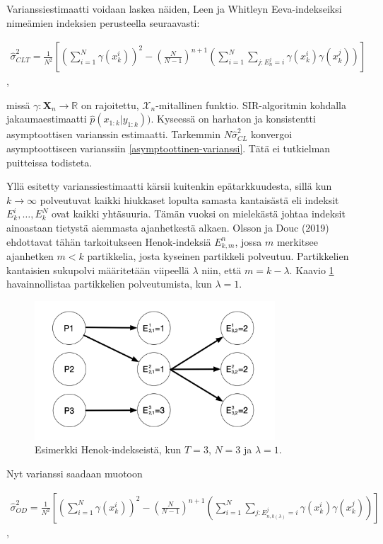 \documentclass[
  12pt,
  a4paper, twoside]{book}
\begin{document}
Varianssiestimaatti voidaan laskea näiden, Leen ja Whitleyn Eeva-indekseiksi nimeämien indeksien perusteella seuraavasti:

\begin{align}\label{CLT-varianssi}
\hat{\sigma}^2_{CLT} = \frac{1}{N^2} \left[ (\sum_{i=1}^N \gamma(x_k^i))^2 - (\frac{N}{N-1})^{n+1} ( \sum_{i=1}^N \sum_{j:E_n^j=i} \gamma(x_k^i) \gamma(x_k^j)) \right]
\end{align},

missä \(\gamma: \mathbf{X}_n \rightarrow \mathbb{R}\) on rajoitettu, \(\mathcal{X}_n\)-mitallinen funktio. SIR-algoritmin kohdalla jakaumaestimaatti \(\hat{p}(x_{1:k}|y_{1:k}))\). Kyseessä on harhaton ja konsistentti asymptoottisen varianssin estimaatti. Tarkemmin \(N\hat{\sigma}^2_{CL}\) konvergoi asymptoottiseen varianssiin \ref{asymptoottinen-varianssi}. Tätä ei tutkielman puitteissa todisteta.

Yllä esitetty varianssiestimaatti kärsii kuitenkin epätarkkuudesta, sillä kun \(k \to \infty\) polveutuvat kaikki hiukkaset lopulta samasta kantaisästä eli indeksit \(E_k^i,\ldots,E_k^N\) ovat kaikki yhtäsuuria. Tämän vuoksi on mielekästä johtaa indeksit ainoastaan tietystä aiemmasta ajanhetkestä alkaen. Olsson ja Douc (2019) \citep{olsson-2019} ehdottavat tähän tarkoitukseen Henok-indeksiä \(E_{k,m}^n\), jossa \(m\) merkitsee ajanhetken \(m<k\) partikkelia, josta kyseinen partikkeli polveutuu. Partikkelien kantaisien sukupolvi määritetään viipeellä \(\lambda\) niin, että \(m=k-\lambda\). Kaavio \ref{fig:henok-indeksit} havainnollistaa partikkelien polveutumista, kun \(\lambda=1\).

\begin{figure}[H]
\centering
\includegraphics[width=9cm]{henokindeksit}
\caption{Esimerkki Henok-indekseistä, kun $T=3$, $N=3$ ja $\lambda=1$.}
\label{fig:henok-indeksit}
\end{figure}

Nyt varianssi saadaan muotoon

\begin{align}\label{OD-varianssi}
\hat{\sigma}^2_{OD} = \frac{1}{N^2} \left[ (\sum_{i=1}^N \gamma(x_k^i))^2 - (\frac{N}{N-1})^{n+1} ( \sum_{i=1}^N \sum_{j:E_{n,k(\lambda)}^j=i} \gamma(x_k^i) \gamma(x_k^j)) \right]
\end{align},
\end{document}
